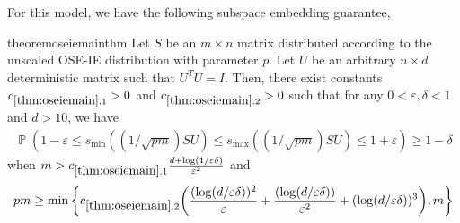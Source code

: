 \documentclass[11pt]{amsart}
\numberwithin{equation}{section}
\numberwithin{equation}{section}
\DeclareMathOperator{\Pb}{\mathbb{P}}
\DeclarePairedDelimiter{\paren}{(}{)}
\theoremstyle{remark}
\theoremstyle{definition}
\begin{document}
For this model, we have the following subspace embedding guarantee,

\begin{restatable}{theorem}{oseiemainthm} \label{thm:oseiemain}
   Let $S$ be an $m \times n$ matrix distributed according to the unscaled OSE-IE distribution with parameter $p$. Let $U$ be an arbitrary $n \times d$ deterministic matrix such that $U^TU=I$. Then, there exist constants $c_{\ref*{thm:oseiemain}.1}>0$ and $c_{\ref*{thm:oseiemain}.2}>0$ such that for any $0 < \varepsilon , \delta < 1$ and $d>10$,
we have
\begin{equation}
    \begin{aligned}
\Pb \left( 1 - \varepsilon  \leq s_{\min}((1/\sqrt{pm})SU)   \leq s_{\max}((1/\sqrt{pm})SU) \leq 1 + \varepsilon \right) \geq 1-\delta
\end{aligned}
\end{equation}
when $m > c_{\ref*{thm:oseiemain}.1}  \frac{d + \log(1/\varepsilon\delta)}{\varepsilon^2} $  and $$pm \geq \min \left\{ c_{\ref*{thm:oseiemain}.2}\paren*{\frac{(\log (d/\varepsilon\delta))^2}{\varepsilon}+\frac{(\log (d/\varepsilon\delta))}{\varepsilon^2} + (\log (d/\varepsilon\delta))^3 } ,m \right\}$$
\end{restatable}
\end{document}
